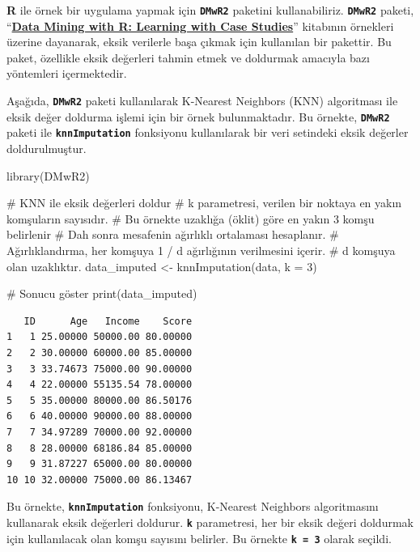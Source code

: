 \documentclass[
  letterpaper,
  DIV=11,
  numbers=noendperiod]{scrreprt}
\newenvironment{Shaded}{\begin{snugshade}}{\end{snugshade}}
\newcommand{\AttributeTok}[1]{\textcolor[rgb]{0.40,0.45,0.13}{#1}}
\newcommand{\CommentTok}[1]{\textcolor[rgb]{0.37,0.37,0.37}{#1}}
\newcommand{\DecValTok}[1]{\textcolor[rgb]{0.68,0.00,0.00}{#1}}
\newcommand{\FunctionTok}[1]{\textcolor[rgb]{0.28,0.35,0.67}{#1}}
\newcommand{\NormalTok}[1]{\textcolor[rgb]{0.00,0.23,0.31}{#1}}
\newcommand{\OtherTok}[1]{\textcolor[rgb]{0.00,0.23,0.31}{#1}}
\begin{document}
\textbf{R} ile örnek bir uygulama yapmak için \textbf{\texttt{DMwR2}}
paketini kullanabiliriz. \textbf{\texttt{DMwR2}} paketi,
``\href{https://www.amazon.com/Data-Mining-Learning-Knowledge-Discovery/dp/1439810184}{\textbf{Data
Mining with R: Learning with Case Studies}}'' kitabının örnekleri
üzerine dayanarak, eksik verilerle başa çıkmak için kullanılan bir
pakettir. Bu paket, özellikle eksik değerleri tahmin etmek ve doldurmak
amacıyla bazı yöntemleri içermektedir.

Aşağıda, \textbf{\texttt{DMwR2}} paketi kullanılarak K-Nearest Neighbors
(KNN) algoritması ile eksik değer doldurma işlemi için bir örnek
bulunmaktadır. Bu örnekte, \textbf{\texttt{DMwR2}} paketi ile
\textbf{\texttt{knnImputation}} fonksiyonu kullanılarak bir veri
setindeki eksik değerler doldurulmuştur.

\begin{Shaded}
\begin{Highlighting}[]
\FunctionTok{library}\NormalTok{(DMwR2)}

\CommentTok{\# KNN ile eksik değerleri doldur}
\CommentTok{\# k parametresi, verilen bir noktaya en yakın komşuların sayısıdır. }
\CommentTok{\# Bu örnekte uzaklığa (öklit) göre en yakın 3 komşu belirlenir}
\CommentTok{\# Dah sonra mesafenin ağırlıklı ortalaması hesaplanır.}
\CommentTok{\# Ağırlıklandırma, her komşuya 1 / d ağırlığının verilmesini içerir.}
\CommentTok{\# d komşuya olan uzaklıktır.}
\NormalTok{data\_imputed }\OtherTok{\textless{}{-}} \FunctionTok{knnImputation}\NormalTok{(data, }\AttributeTok{k =} \DecValTok{3}\NormalTok{)}

\CommentTok{\# Sonucu göster}
\FunctionTok{print}\NormalTok{(data\_imputed)}
\end{Highlighting}
\end{Shaded}

\begin{verbatim}
   ID      Age   Income    Score
1   1 25.00000 50000.00 80.00000
2   2 30.00000 60000.00 85.00000
3   3 33.74673 75000.00 90.00000
4   4 22.00000 55135.54 78.00000
5   5 35.00000 80000.00 86.50176
6   6 40.00000 90000.00 88.00000
7   7 34.97289 70000.00 92.00000
8   8 28.00000 68186.84 85.00000
9   9 31.87227 65000.00 80.00000
10 10 32.00000 75000.00 86.13467
\end{verbatim}

Bu örnekte, \textbf{\texttt{knnImputation}} fonksiyonu, K-Nearest
Neighbors algoritmasını kullanarak eksik değerleri doldurur.
\textbf{\texttt{k}} parametresi, her bir eksik değeri doldurmak için
kullanılacak olan komşu sayısını belirler. Bu örnekte
\textbf{\texttt{k\ =\ 3}} olarak seçildi.
\end{document}
